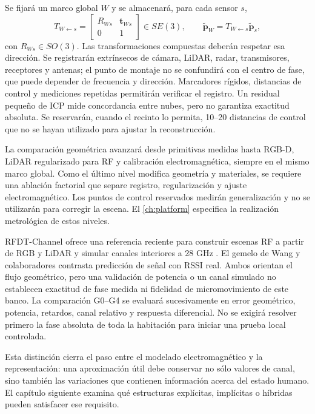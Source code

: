 Se fijará un marco global $W$ y se almacenará, para cada sensor $s$,
\begin{equation}
T_{W\leftarrow s}=\begin{bmatrix}R_{Ws}&\mathbf t_{Ws}\\0&1\end{bmatrix}\in SE(3),
\qquad \widetilde{\mathbf p}_W=T_{W\leftarrow s}\widetilde{\mathbf p}_s,
\label{eq:scene_extrinsics}
\end{equation}
con $R_{Ws}\in SO(3)$. Las transformaciones compuestas deberán respetar esa dirección.
Se registrarán extrínsecos de cámara, LiDAR, radar, transmisores, receptores y antenas;
el punto de montaje no se confundirá con el centro de fase, que puede depender de
frecuencia y dirección. Marcadores rígidos, distancias de control y mediciones repetidas
permitirán verificar el registro. Un residual pequeño de ICP mide concordancia entre
nubes, pero no garantiza exactitud absoluta. Se reservarán, cuando el recinto lo permita,
10--20 distancias de control que no se hayan utilizado para ajustar la reconstrucción.

La comparación geométrica avanzará desde primitivas medidas hasta RGB-D, LiDAR
regularizado para RF y calibración electromagnética, siempre en el mismo marco global.
Como el último nivel modifica geometría y materiales, se requiere una ablación
factorial que separe registro, regularización y ajuste electromagnético. Los puntos
de control reservados medirán generalización y no se utilizarán para corregir la
escena. El \cref{ch:platform} especifica la realización metrológica de estos niveles.

RFDT-Channel ofrece una referencia reciente para construir escenas RF a partir de
RGB y LiDAR y simular canales interiores a 28 GHz \citep{Yao2026RFDTChannel}.
El gemelo de Wang y colaboradores \citep{Wang2026WiFiTwin} contrasta predicción de señal con RSSI real.
Ambos orientan el flujo geométrico, pero una validación de potencia o un canal simulado
no establecen exactitud de fase medida ni fidelidad de micromovimiento de este banco.
La comparación G0--G4 se evaluará sucesivamente en error geométrico, potencia,
retardos, canal relativo y respuesta diferencial. No se exigirá resolver primero
la fase absoluta de toda la habitación para iniciar una prueba local controlada.

Esta distinción cierra el paso entre el modelado electromagnético y la representación: una
aproximación útil debe conservar no sólo valores de canal, sino también las variaciones
que contienen información acerca del estado humano. El capítulo siguiente examina qué
estructuras explícitas, implícitas o híbridas pueden satisfacer ese requisito.

